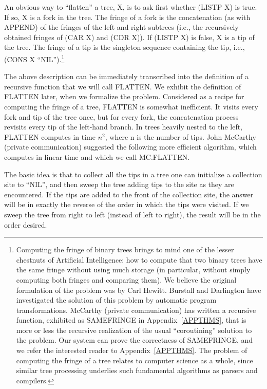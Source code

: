 \documentclass[10pt]{book}
\begin{document}
An obvious way to
``flatten'' a tree, X, is to ask first whether (LISTP X) is true.  If so, X is a fork in
the tree.  The fringe of a fork is the concatenation (as with APPEND) of
the fringes of the left and right subtrees (i.e., the recursively obtained
fringes of (CAR X) and (CDR X)).
If (LISTP X) is false, X is a tip of the tree.  The fringe of
a tip is the singleton sequence containing the tip, i.e., (CONS X ``NIL'').\footnote{Computing the fringe of binary trees brings to mind one of the lesser chestnuts of Artificial Intelligence: how to compute that two binary trees have the same fringe without using much storage (in particular, without simply computing both fringes and comparing them).  We believe the original formulation of the problem was by Carl Hewitt.  Burstall and Darlington \cite{BURSTALLTRANS} have investigated the solution  of this problem by automatic program transformations. McCarthy (private communication) has written a recursive function, exhibited as SAMEFRINGE in Appendix~\ref{APPTHMS}, that is more or less the recursive realization of the usual ``coroutining'' solution to the problem.  Our system can prove the correctness of SAMEFRINGE, and we refer the interested reader to Appendix~\ref{APPTHMS}.  The problem of computing the fringe of a tree relates to computer science as a whole, since similar tree processing underlies such fundamental algorithms as parsers and compilers.}

The above description can be immediately transcribed into
the definition of a recursive function that we will call FLATTEN.  We exhibit the
definition of FLATTEN later, when we formalize the problem.
Considered as a recipe for computing the fringe of a tree, FLATTEN
is somewhat inefficient.  It visits every fork and tip of the tree once, but
for every fork, the concatenation process revisits
every tip of the left-hand branch.  In trees heavily nested to the left,
FLATTEN computes in time $n^{2}$, where n is the number of tips.
John McCarthy (private communication)
suggested the following more efficient algorithm, which computes
in linear time and which we call MC.FLATTEN.

The basic idea is that to collect all the tips in a
tree one can initialize a collection site to ``NIL'', and then
sweep the tree adding tips to the site as they are encountered.
If the tips are added to the front of the collection site, the answer will be in
exactly the reverse of the order in which the tips were visited.
If we sweep the tree from right to left (instead of left to right), the result will be
in the order desired.
\end{document}

